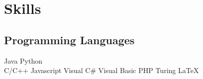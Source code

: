 \documentclass[]{deedy-resume-openfont}
\begin{document}
\begin{minipage}[t]{0.33\textwidth}




\section{Skills}
\subsection{Programming Languages}
Java \textbullet{} Python\\  %
\vspace{1mm}
C/C++  \textbullet{} Javascript \textbullet{} Visual C\# \textbullet{}Visual Basic \textbullet{} PHP \textbullet{} Turing \textbullet{} \LaTeX
\sectionsep


\end{minipage}
\end{document}
